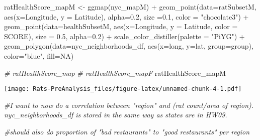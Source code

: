 \documentclass[
]{article}
\newenvironment{Shaded}{\begin{snugshade}}{\end{snugshade}}
\newcommand{\AttributeTok}[1]{\textcolor[rgb]{0.77,0.63,0.00}{#1}}
\newcommand{\CommentTok}[1]{\textcolor[rgb]{0.56,0.35,0.01}{\textit{#1}}}
\newcommand{\ConstantTok}[1]{\textcolor[rgb]{0.00,0.00,0.00}{#1}}
\newcommand{\FloatTok}[1]{\textcolor[rgb]{0.00,0.00,0.81}{#1}}
\newcommand{\FunctionTok}[1]{\textcolor[rgb]{0.00,0.00,0.00}{#1}}
\newcommand{\NormalTok}[1]{#1}
\newcommand{\OtherTok}[1]{\textcolor[rgb]{0.56,0.35,0.01}{#1}}
\newcommand{\SpecialCharTok}[1]{\textcolor[rgb]{0.00,0.00,0.00}{#1}}
\newcommand{\StringTok}[1]{\textcolor[rgb]{0.31,0.60,0.02}{#1}}
\begin{document}
\begin{Shaded}
\begin{Highlighting}[]
\NormalTok{ratHealthScore\_mapM }\OtherTok{\textless{}{-}} \FunctionTok{ggmap}\NormalTok{(nyc\_mapM) }\SpecialCharTok{+}
  \FunctionTok{geom\_point}\NormalTok{(}\AttributeTok{data=}\NormalTok{ratSubsetM, }\FunctionTok{aes}\NormalTok{(}\AttributeTok{x=}\NormalTok{Longitude, }\AttributeTok{y =}\NormalTok{ Latitude), }\AttributeTok{alpha=}\FloatTok{0.2}\NormalTok{, }\AttributeTok{size =}\FloatTok{0.1}\NormalTok{, }\AttributeTok{color =} \StringTok{"chocolate3"}\NormalTok{) }\SpecialCharTok{+}
  \FunctionTok{geom\_point}\NormalTok{(}\AttributeTok{data=}\NormalTok{healthSubsetM, }\FunctionTok{aes}\NormalTok{(}\AttributeTok{x=}\NormalTok{Longitude, }\AttributeTok{y =}\NormalTok{ Latitude, }\AttributeTok{color =}\NormalTok{ SCORE), }\AttributeTok{size =} \FloatTok{0.5}\NormalTok{, }\AttributeTok{alpha=}\FloatTok{0.2}\NormalTok{) }\SpecialCharTok{+} 
  \FunctionTok{scale\_color\_distiller}\NormalTok{(}\AttributeTok{palette =} \StringTok{"PiYG"}\NormalTok{) }\SpecialCharTok{+} 
  \FunctionTok{geom\_polygon}\NormalTok{(}\AttributeTok{data=}\NormalTok{nyc\_neighborhoods\_df, }\FunctionTok{aes}\NormalTok{(}\AttributeTok{x=}\NormalTok{long, }\AttributeTok{y=}\NormalTok{lat, }\AttributeTok{group=}\NormalTok{group), }\AttributeTok{color=}\StringTok{"blue"}\NormalTok{, }\AttributeTok{fill=}\ConstantTok{NA}\NormalTok{)}

\CommentTok{\# ratHealthScore\_map}
\CommentTok{\# ratHealthScore\_mapF}
\NormalTok{ratHealthScore\_mapM}
\end{Highlighting}
\end{Shaded}

\texttt{[image: Rats-PreAnalysis\_files/figure-latex/unnamed-chunk-4-1.pdf]}

\begin{Shaded}
\begin{Highlighting}[]
\CommentTok{\#I want to now do a correlation between "region" and (rat count/area of region). nyc\_neighborhoods\_df is stored in the same way as states are in HW09.}

\CommentTok{\#should also do proportion of "bad restaurants" to "good restaurants" per region}
\end{Highlighting}
\end{Shaded}
\end{document}
